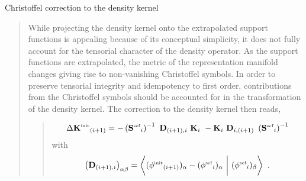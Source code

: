 \documentclass[letterpaper,10pt,english]{sphinxmanual}
\begin{document}
Christoffel correction to the density kernel
\begin{quote}

\begin{DUlineblock}{0em}
\item[] While projecting the density kernel onto the extrapolated support
functions is appealing because of its conceptual simplicity, it
does not fully account for the tensorial character of the density
operator. As the support functions are extrapolated, the metric of
the representation manifold changes giving rise to non-vanishing
Christoffel symbols. In order to preserve tensorial integrity and
idempotency to first order, contributions from the Christoffel
symbols should be accounted for in the transformation of the
density kernel. The correction to the density kernel then reads,
\end{DUlineblock}
\begin{quote}
\begin{equation*}
\begin{split}\Delta \mathbf{K}{^{\mbox{\tiny{init}}}}_{(i+1)} = -\left(\mathbf{S}{^{\mbox{\tiny{scf}}}}_{i} \right)^{-1}\  \mathbf{D}_{(i+1),i}\ \mathbf{K}_{i} \ - \mathbf{K}_{i}\ \mathbf{D}_{i,(i+1)}\ \left(\mathbf{S}{^{\mbox{\tiny{scf}}}}_{i} \right)^{-1}\end{split}
\end{equation*}
with
\begin{equation*}
\begin{split}\left(\mathbf{D}_{(i+1),i}\right)_{\alpha \beta} = \left \langle (\phi{^{\mbox{\tiny{init}}}}_{(i+1)})_{\alpha} - (\phi{^{\mbox{\tiny{scf}}}}_{i})_{\alpha} \ \bigg| \  (\phi{^{\mbox{\tiny{scf}}}}_{i})_{\beta} \right \rangle \ .\end{split}
\end{equation*}\end{quote}
\end{quote}
\end{document}
